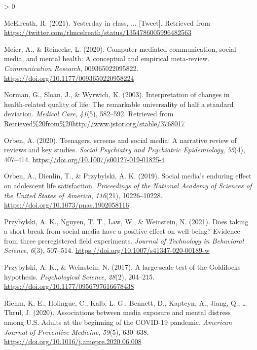 \documentclass[
  english,
  man,floatsintext]{apa6}
\newlength{\cslhangindent}
\newenvironment{CSLReferences}[2] %
 {%
  \setlength{\parindent}{0pt}
  \ifodd #1 \everypar{\setlength{\hangindent}{\cslhangindent}}\ignorespaces\fi
  \ifnum #2 > 0
  \setlength{\parskip}{#2\baselineskip}
  \fi
 }%
 {}
\begin{document}
\begin{CSLReferences}{1}{0}
\leavevmode\hypertarget{ref-mcelreathYesterdayClass2021}{}%
McElreath, R. (2021). Yesterday in class, ... {[}Tweet{]}. Retrieved from \url{https://twitter.com/rlmcelreath/status/1354786005996482563}

\leavevmode\hypertarget{ref-meierComputermediatedCommunicationSocial2020a}{}%
Meier, A., \& Reinecke, L. (2020). Computer-mediated communication, social media, and mental health: {A} conceptual and empirical meta-review. \emph{Communication Research}, 009365022095822. \url{https://doi.org/10.1177/0093650220958224}

\leavevmode\hypertarget{ref-normanInterpretationChangesHealthrelated2003}{}%
Norman, G., Sloan, J., \& Wyrwich, K. (2003). Interpretation of changes in health-related quality of life: {The} remarkable universality of half a standard deviation. \emph{Medical Care}, \emph{41}(5), 582--592. Retrieved from \url{Retrieved\%20from\%20http://www.jstor.org/stable/3768017}

\leavevmode\hypertarget{ref-orbenTeenagersScreensSocial2020}{}%
Orben, A. (2020). Teenagers, screens and social media: A narrative review of reviews and key studies. \emph{Social Psychiatry and Psychiatric Epidemiology}, \emph{55}(4), 407--414. \url{https://doi.org/10.1007/s00127-019-01825-4}

\leavevmode\hypertarget{ref-orbenSocialMediaEnduring2019}{}%
Orben, A., Dienlin, T., \& Przybylski, A. K. (2019). Social media's enduring effect on adolescent life satisfaction. \emph{Proceedings of the National Academy of Sciences of the United States of America}, \emph{116}(21), 10226--10228. \url{https://doi.org/10.1073/pnas.1902058116}

\leavevmode\hypertarget{ref-przybylskiDoesTakingShort2021a}{}%
Przybylski, A. K., Nguyen, T. T., Law, W., \& Weinstein, N. (2021). Does taking a short break from social media have a positive effect on well-being? {Evidence} from three preregistered field experiments. \emph{Journal of Technology in Behavioral Science}, \emph{6}(3), 507--514. \url{https://doi.org/10.1007/s41347-020-00189-w}

\leavevmode\hypertarget{ref-przybylskiLargescaleTestGoldilocks2017}{}%
Przybylski, A. K., \& Weinstein, N. (2017). A large-scale test of the {Goldilocks} hypothesis. \emph{Psychological Science}, \emph{28}(2), 204--215. \url{https://doi.org/10.1177/0956797616678438}

\leavevmode\hypertarget{ref-riehmAssociationsMediaExposure2020}{}%
Riehm, K. E., Holingue, C., Kalb, L. G., Bennett, D., Kapteyn, A., Jiang, Q., \ldots{} Thrul, J. (2020). Associations between media exposure and mental distress among {U}.{S}. Adults at the beginning of the {COVID}-19 pandemic. \emph{American Journal of Preventive Medicine}, \emph{59}(5), 630--638. \url{https://doi.org/10.1016/j.amepre.2020.06.008}


\end{CSLReferences}
\end{document}
